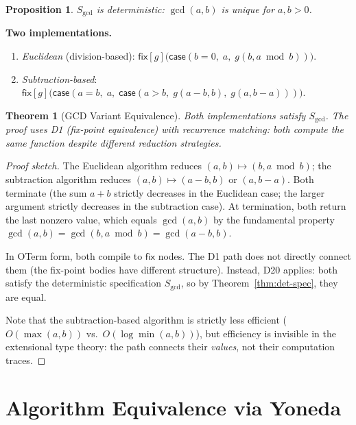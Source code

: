 \documentclass[11pt,a4paper]{report}
\theoremstyle{definition}
\theoremstyle{plain}
\newtheorem{theorem}[definition]{Theorem}
\newtheorem{proposition}[definition]{Proposition}
\begin{document}
\begin{proposition}
$S_{\gcd}$ is deterministic: $\gcd(a, b)$ is unique for $a, b > 0$.
\end{proposition}

\noindent\textbf{Two implementations.}
\begin{enumerate}
  \item \emph{Euclidean} (division-based):
    $\mathsf{fix}[g]\bigl(\mathsf{case}(b = 0,\; a,\;
      g(b, a \bmod b))\bigr)$.
  \item \emph{Subtraction-based}:
    $\mathsf{fix}[g]\bigl(\mathsf{case}(a = b,\; a,\;
      \mathsf{case}(a > b,\; g(a{-}b, b),\; g(a, b{-}a)))\bigr)$.
\end{enumerate}

\begin{theorem}[GCD Variant Equivalence]
Both implementations satisfy $S_{\gcd}$.  The proof uses D1
(fix-point equivalence) with \emph{recurrence matching}:
both compute the same function despite different reduction strategies.
\end{theorem}

\begin{proof}[Proof sketch]
The Euclidean algorithm reduces $(a, b) \mapsto (b, a \bmod b)$;
the subtraction algorithm reduces
$(a, b) \mapsto (a - b, b)$ or $(a, b - a)$.
Both terminate (the sum $a + b$ strictly decreases in the
Euclidean case; the larger argument strictly decreases in the
subtraction case).  At termination, both return the last nonzero
value, which equals $\gcd(a, b)$ by the fundamental property
$\gcd(a, b) = \gcd(b, a \bmod b) = \gcd(a - b, b)$.

In OTerm form, both compile to $\mathsf{fix}$ nodes.  The D1
path does not directly connect them (the fix-point bodies have
different structure).  Instead, D20 applies: both satisfy the
deterministic specification $S_{\gcd}$, so by
Theorem~\ref{thm:det-spec}, they are equal.

Note that the subtraction-based algorithm is strictly less
efficient ($O(\max(a,b))$ vs.\ $O(\log \min(a,b))$), but
efficiency is invisible in the extensional type theory: the
path connects their \emph{values}, not their computation traces.
\end{proof}


\section{Algorithm Equivalence via Yoneda}
\label{sec:yoneda-algo}
\end{document}
